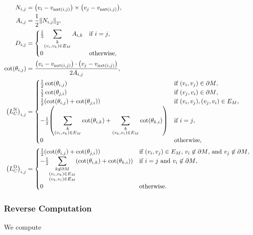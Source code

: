 \begin{align*}
	N_{i, j} &= \pof{v_i - v_{\nxt\pof{i, j}}} \times \pof{v_j - v_{\nxt\pof{i, j}}}, \\
	A_{i, j} &= \frac{1}{2}\norm{N_{i, j}}_2, \\
	D_{i, j} &= \begin{cases}
		\frac{1}{3}{\displaystyle\sum_{\substack{k \\ \pof{v_i, v_k} \in E_M}}A_{i, k}} & \text{if \(i = j\)}, \\
		0 & \text{otherwise},
	\end{cases} \\
	\cot\pof{\theta_{i, j}} &= \frac{\pof{v_i - v_{\nxt\pof{i, j}}} \cdot \pof{v_j - v_{\nxt\pof{i, j}}}}{2A_{i, j}}, \\
	\pof{L_C^{\text{N}}}_{i, j} &= \begin{cases}
		\frac{1}{2}\cot\pof{\theta_{i, j}} & \text{if \(\pof{v_i, v_j} \in \partial M\)}, \\
		\frac{1}{2}\cot\pof{\theta_{j, i}} & \text{if \(\pof{v_j, v_i} \in \partial M\)}, \\
		\frac{1}{2}\pof{\cot\pof{\theta_{i, j}} + \cot\pof{\theta_{j, i}}} & \text{if \(\pof{v_i, v_j}, \pof{v_j, v_i} \in E_M\)}, \\
		-\frac{1}{2}\pof{\displaystyle\sum_{\substack{k \\ \pof{v_i, v_k} \in E_M}}\cot\pof{\theta_{i, k}} + \sum_{\substack{k \\ \pof{v_k, v_i} \in E_M}}\cot\pof{\theta_{k, i}}} & \text{if \(i = j\)}, \\
		0 & \text{otherwise},
	\end{cases} \\
	\pof{L_C^{\text{D}}}_{i, j} &= \begin{cases}
		\frac{1}{2}\pof{\cot\pof{\theta_{i, j}} + \cot\pof{\theta_{j, i}}} & \text{if \(\pof{v_i, v_j} \in E_M\), \(v_i \not\in \partial M\), and \(v_j \not\in \partial M\)}, \\
		-\frac{1}{2}{\displaystyle\sum_{\substack{k \not\in \partial M \\ \pof{v_i, v_k} \in E_M \\ \pof{v_k, v_i} \in E_M}}\pof{\cot\pof{\theta_{i, k}} + \cot\pof{\theta_{k, i}}}} & \text{if \(i = j\) and \(v_i \not\in \partial M\)}, \\
		0 & \text{otherwise}.
	\end{cases}
\end{align*}

\subsubsection{Reverse Computation}
We compute

